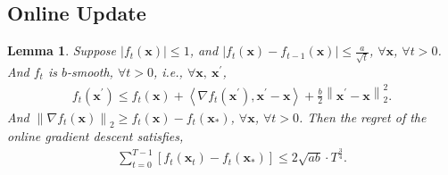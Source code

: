 \documentclass[10pt]{article}
\def\rvx{{\mathbf{x}}}
\newtheorem{lem}{Lemma}
\begin{document}
\subsection{Online Update}

\begin{lem}
    Suppose $\left| f_t\left(\rvx\right) \right| \le 1$, and $\left| f_t\left(\rvx\right) - f_{t-1}\left(\rvx\right) \right| \le \frac{a}{\sqrt{t}}$, $\forall \rvx$, $\forall t > 0$. And $f_t$ is $b$-smooth, $\forall t > 0$, i.e., $\forall \rvx, \ \rvx^\prime$,
\begin{equation*}
\begin{split}
    f_t\left(\rvx^\prime\right) \le f_t\left(\rvx\right) + \left\langle \nabla f_t\left(\rvx^\prime\right) , \rvx^\prime - \rvx \right\rangle +  \frac{b}{2} \left\| \rvx^\prime - \rvx \right\|_2^2.
\end{split}
\end{equation*}
And $\left\| \nabla f_t\left(\rvx\right) \right\|_2 \ge f_t\left(\rvx\right) - f_t\left(\rvx_*\right)$, $\forall \rvx$, $\forall t > 0$. Then the regret of the  online gradient descent satisfies,
\begin{equation*}
\begin{split}
    \sum\limits_{t=0}^{T-1}{\left[ f_t\left(\rvx_t\right) - f_t\left( \rvx_* \right) \right]} \le 2 \sqrt{ab} \cdot T^{\frac{3}{4}}.
\end{split}
\end{equation*}
\end{lem}
\end{document}
